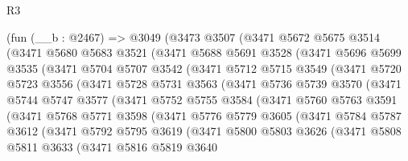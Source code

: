 \begin{lexlean}{R3}
\begin{coremodule}
    (fun (__b : @2467) =>
    @3049
      (@3473
        @3507
        (@3471
          @5672
          @5675
          @3514
          (@3471
            @5680
            @5683
            @3521
            (@3471
              @5688
              @5691
              @3528
              (@3471
                @5696
                @5699
                @3535
                (@3471
                  @5704
                  @5707
                  @3542
                  (@3471
                    @5712
                    @5715
                    @3549
                    (@3471
                      @5720
                      @5723
                      @3556
                      (@3471
                        @5728
                        @5731
                        @3563
                        (@3471
                          @5736
                          @5739
                          @3570
                          (@3471
                            @5744
                            @5747
                            @3577
                            (@3471
                              @5752
                              @5755
                              @3584
                              (@3471
                                @5760
                                @5763
                                @3591
                                (@3471
                                  @5768
                                  @5771
                                  @3598
                                  (@3471
                                    @5776
                                    @5779
                                    @3605
                                    (@3471
                                      @5784
                                      @5787
                                      @3612
                                      (@3471
                                        @5792
                                        @5795
                                        @3619
                                        (@3471
                                          @5800
                                          @5803
                                          @3626
                                          (@3471
                                            @5808
                                            @5811
                                            @3633
                                            (@3471
                                              @5816
                                              @5819
                                              @3640

\end{coremodule}
\end{lexlean}
